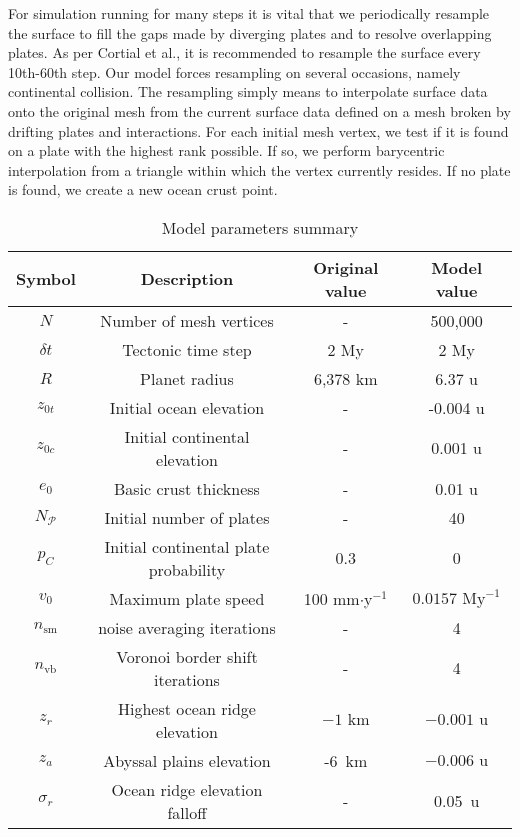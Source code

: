 For simulation running for many steps it is vital that we periodically resample the surface to fill the gaps made by diverging plates and to resolve overlapping plates. As per Cortial et al., it is recommended to resample the surface every 10th-60th step. Our model forces resampling on several occasions, namely continental collision. The resampling simply means to interpolate surface data onto the original mesh from the current surface data defined on a mesh broken by drifting plates and interactions. For each initial mesh vertex, we test if it is found on a plate with the highest rank possible. If so, we perform barycentric interpolation from a triangle within which the vertex currently resides. If no plate is found, we create a new ocean crust point.
\begin{table}[h]
\centering
\begin{tabular}{cccc}
\textbf{Symbol}&\textbf{Description}&\textbf{Original value}&\textbf{Model value}\\
\hline
$N$&Number of mesh vertices&-&500,000\\
$\delta t$&Tectonic time step&2 My&2 My\\
$R$&Planet radius&6,378 km&6.37 u\\
$z_{0t}$&Initial ocean elevation&-&-0.004 u\\
$z_{0c}$&Initial continental elevation&-&0.001 u\\
$e_0$&Basic crust thickness&-&0.01 u\\
$N_\mathcal{P}$&Initial number of plates&-&40\\
$p_C$&Initial continental plate probability&0.3&0\\
$v_0$&Maximum plate speed&100 mm$\cdot$y$^{-1}$&$0.0157\mbox{ My}^{-1}$\\
$n_{\mbox{sm}}$&noise averaging iterations&-&4\\
$n_{\mbox{vb}}$&Voronoi border shift iterations&-&4\\
$z_r$&Highest ocean ridge elevation&$-1\mbox{ km}$&$-0.001\mbox{ u}$\\
$z_a$&Abyssal plains elevation&-6\mbox{ km}&$-0.006\mbox{ u}$\\
$\sigma_r$&Ocean ridge elevation falloff&-&0.05\mbox{ u}\\
\end{tabular}
\caption{Model parameters summary}
\label{tab:model-parameters-summary}
\end{table}
